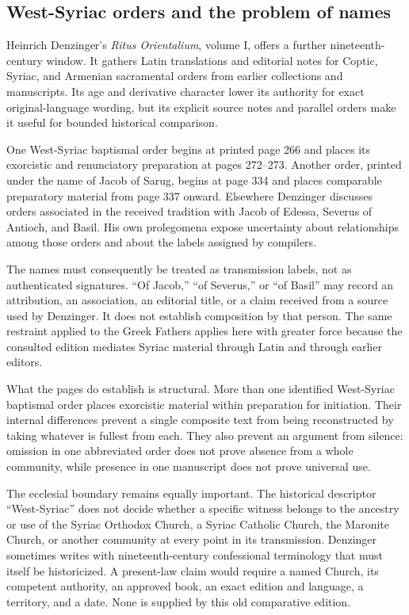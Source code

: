 \subsection{West-Syriac orders and the problem of names}

Heinrich Denzinger's \emph{Ritus Orientalium}, volume I, offers a further
nineteenth-century window. It gathers Latin translations and editorial notes
for Coptic, Syriac, and Armenian sacramental orders from earlier collections
and manuscripts. Its age and derivative character lower its authority for
exact original-language wording, but its explicit source notes and parallel
orders make it useful for bounded historical comparison.

One West-Syriac baptismal order begins at printed page 266 and places its
exorcistic and renunciatory preparation at pages 272--273. Another order,
printed under the name of Jacob of Sarug, begins at page 334 and places
comparable preparatory material from page 337 onward. Elsewhere Denzinger
discusses orders associated in the received tradition with Jacob of Edessa,
Severus of Antioch, and Basil. His own prolegomena expose uncertainty about
relationships among those orders and about the labels assigned by compilers.

The names must consequently be treated as transmission labels, not as
authenticated signatures. ``Of Jacob,'' ``of Severus,'' or ``of Basil'' may
record an attribution, an association, an editorial title, or a claim received
from a source used by Denzinger. It does not establish composition by that
person. The same restraint applied to the Greek Fathers applies here with
greater force because the consulted edition mediates Syriac material through
Latin and through earlier editors.

What the pages do establish is structural. More than one identified
West-Syriac baptismal order places exorcistic material within preparation for
initiation. Their internal differences prevent a single composite text from
being reconstructed by taking whatever is fullest from each. They also prevent
an argument from silence: omission in one abbreviated order does not prove
absence from a whole community, while presence in one manuscript does not
prove universal use.

The ecclesial boundary remains equally important. The historical descriptor
``West-Syriac'' does not decide whether a specific witness belongs to the
ancestry or use of the Syriac Orthodox Church, a Syriac Catholic Church, the
Maronite Church, or another community at every point in its transmission.
Denzinger sometimes writes with nineteenth-century confessional terminology
that must itself be historicized. A present-law claim would require a named
Church, its competent authority, an approved book, an exact edition and
language, a territory, and a date. None is supplied by this old comparative
edition.

